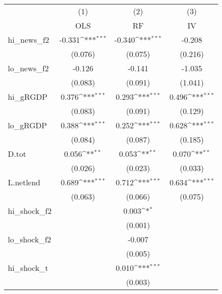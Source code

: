 {
\def\sym#1{\ifmmode^{#1}\else\(^{#1}\)\fi}
\begin{tabular}{l*{3}{c}}
\toprule
            &\multicolumn{1}{c}{(1)}&\multicolumn{1}{c}{(2)}&\multicolumn{1}{c}{(3)}\\
            &\multicolumn{1}{c}{OLS}&\multicolumn{1}{c}{RF}&\multicolumn{1}{c}{IV}\\
\midrule
hi\_news\_f2  &      -0.331\sym{***}&      -0.340\sym{***}&      -0.208         \\
            &     (0.076)         &     (0.075)         &     (0.216)         \\
\addlinespace
lo\_news\_f2  &      -0.126         &      -0.141         &      -1.035         \\
            &     (0.083)         &     (0.091)         &     (1.041)         \\
\addlinespace
hi\_gRGDP    &       0.376\sym{***}&       0.293\sym{***}&       0.496\sym{***}\\
            &     (0.083)         &     (0.091)         &     (0.129)         \\
\addlinespace
lo\_gRGDP    &       0.388\sym{***}&       0.252\sym{***}&       0.628\sym{***}\\
            &     (0.084)         &     (0.087)         &     (0.185)         \\
\addlinespace
D.tot       &       0.056\sym{**} &       0.053\sym{**} &       0.070\sym{**} \\
            &     (0.026)         &     (0.023)         &     (0.033)         \\
\addlinespace
L.netlend   &       0.689\sym{***}&       0.712\sym{***}&       0.634\sym{***}\\
            &     (0.063)         &     (0.066)         &     (0.075)         \\
\addlinespace
hi\_shock\_f2 &                     &       0.003\sym{*}  &                     \\
            &                     &     (0.001)         &                     \\
\addlinespace
lo\_shock\_f2 &                     &      -0.007         &                     \\
            &                     &     (0.005)         &                     \\
\addlinespace
hi\_shock\_t  &                     &       0.010\sym{***}&                     \\
            &                     &     (0.003)         &                     \\

\end{tabular}}
